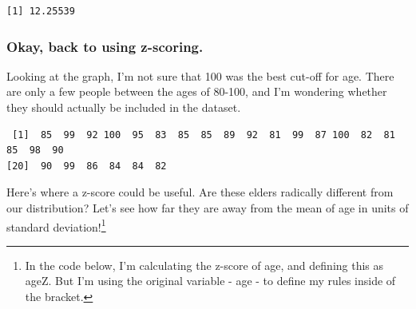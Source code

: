 \documentclass[
  letterpaper,
  DIV=11,
  numbers=noendperiod,
  oneside]{scrreprt}
\newenvironment{Shaded}{\begin{snugshade}}{\end{snugshade}}
\newcommand{\AttributeTok}[1]{\textcolor[rgb]{0.40,0.45,0.13}{#1}}
\newcommand{\DecValTok}[1]{\textcolor[rgb]{0.68,0.00,0.00}{#1}}
\newcommand{\FunctionTok}[1]{\textcolor[rgb]{0.28,0.35,0.67}{#1}}
\newcommand{\NormalTok}[1]{\textcolor[rgb]{0.00,0.23,0.31}{#1}}
\newcommand{\OtherTok}[1]{\textcolor[rgb]{0.00,0.23,0.31}{#1}}
\newcommand{\SpecialCharTok}[1]{\textcolor[rgb]{0.37,0.37,0.37}{#1}}
\begin{document}
\begin{Shaded}
\end{Shaded}

\begin{verbatim}
[1] 12.25539
\end{verbatim}

\subsubsection{Okay, back to using
z-scoring.}\label{okay-back-to-using-z-scoring.}

Looking at the graph, I'm not sure that 100 was the best cut-off for
age. There are only a few people between the ages of 80-100, and I'm
wondering whether they should actually be included in the dataset.

\begin{Shaded}
\end{Shaded}

\begin{verbatim}
 [1]  85  99  92 100  95  83  85  85  89  92  81  99  87 100  82  81  85  98  90
[20]  90  99  86  84  84  82
\end{verbatim}

Here's where a z-score could be useful. Are these elders radically
different from our distribution? Let's see how far they are away from
the mean of age in units of standard deviation!\footnote{In the code
  below, I'm calculating the z-score of age, and defining this as ageZ.
  But I'm using the original variable - age - to define my rules inside
  of the bracket.}

\begin{Shaded}
\end{Shaded}
\end{document}
